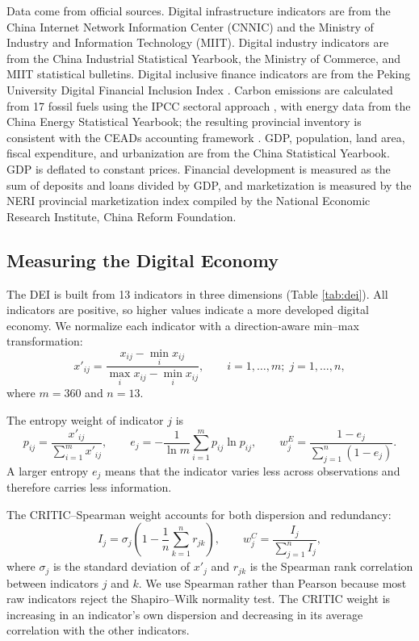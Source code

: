 \documentclass[economies,article,submit,moreauthors]{Definitions/mdpi}
\begin{document}
Data come from official sources. Digital infrastructure indicators are from the China Internet Network Information Center (CNNIC) and the Ministry of Industry and Information Technology (MIIT). Digital industry indicators are from the China Industrial Statistical Yearbook, the Ministry of Commerce, and MIIT statistical bulletins. Digital inclusive finance indicators are from the Peking University Digital Financial Inclusion Index \citep{guo2020report}. Carbon emissions are calculated from 17 fossil fuels using the IPCC sectoral approach \citep{ipcc2006}, with energy data from the China Energy Statistical Yearbook; the resulting provincial inventory is consistent with the CEADs accounting framework \citep{shan2018}. GDP, population, land area, fiscal expenditure, and urbanization are from the China Statistical Yearbook. GDP is deflated to constant prices. Financial development is measured as the sum of deposits and loans divided by GDP, and marketization is measured by the NERI provincial marketization index compiled by the National Economic Research Institute, China Reform Foundation.

\subsection{Measuring the Digital Economy}

The DEI is built from 13 indicators in three dimensions (Table \ref{tab:dei}). All indicators are positive, so higher values indicate a more developed digital economy. We normalize each indicator with a direction-aware min--max transformation:
\begin{equation}
x'_{ij}=\frac{x_{ij}-\min_{i}x_{ij}}{\max_{i}x_{ij}-\min_{i}x_{ij}},
\qquad i=1,\dots,m;\; j=1,\dots,n,
\label{eq:minmax}
\end{equation}
where $m=360$ and $n=13$.

The entropy weight of indicator $j$ is
\begin{equation}
p_{ij}=\frac{x'_{ij}}{\sum_{i=1}^{m}x'_{ij}},
\qquad
e_j=-\frac{1}{\ln m}\sum_{i=1}^{m}p_{ij}\ln p_{ij},
\qquad
w_j^{E}=\frac{1-e_j}{\sum_{j=1}^{n}(1-e_j)}.
\label{eq:entropy}
\end{equation}
A larger entropy $e_j$ means that the indicator varies less across observations and therefore carries less information.

The CRITIC--Spearman weight accounts for both dispersion and redundancy:
\begin{equation}
I_j=\sigma_j\left(1-\frac{1}{n}\sum_{k=1}^{n}r_{jk}\right),
\qquad
w_j^{C}=\frac{I_j}{\sum_{j=1}^{n}I_j},
\label{eq:critic}
\end{equation}
where $\sigma_j$ is the standard deviation of $x'_j$ and $r_{jk}$ is the Spearman rank correlation between indicators $j$ and $k$. We use Spearman rather than Pearson because most raw indicators reject the Shapiro--Wilk normality test. The CRITIC weight is increasing in an indicator's own dispersion and decreasing in its average correlation with the other indicators.
\end{document}
